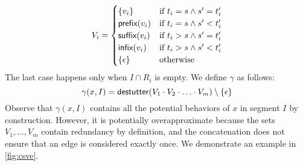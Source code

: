 \small
\begin{equation} \label{eq:valexprset}
	V_i = 
	\begin{cases}
		\{v_i\} & \text{if } t_i = s \land s' = t_i' \\
		\textsf{prefix}(v_i) & \text{if } t_i = s \land s' < t_i' \\
		\textsf{suffix}(v_i) & \text{if } t_i > s \land s' = t_i' \\
		\textsf{infix}(v_i) & \text{if } t_i > s \land s' < t_i' \\
		\{\epsilon\} & \text{otherwise}
	\end{cases}
\end{equation}
\normalsize
The last case happens only when \( I \cap R_i \) is empty.
We define \(\gamma\) as follows:
\[ \gamma(x,I) = \mathsf{destutter}(V_1 \cdot V_2 \cdot \ldots \cdot V_m) \setminus \{\epsilon\} \]
Observe that \(\gamma(x,I)\) contains all the potential behaviors of \( x \) in segment \( I \) by construction.
However, it is potentially overapproximate because the sets \( V_1, \ldots, V_m \) contain redundancy by definition, and the concatenation does not ensure that an edge is considered exactly once.
We demonstrate an example in \cref{fig:csve}.





